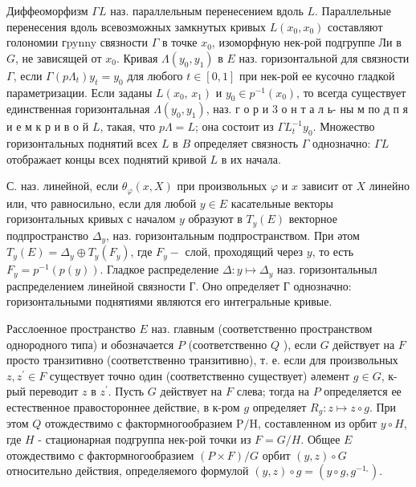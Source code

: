 \documentclass[10pt]{article}
\begin{document}
Диффеоморфизм $\Gamma L$ наз. параллельным перенесением вдоль $L$. Параллельные перенесения вдоль всевозможных замкнутых кривых $L\left(x_{0}, x_{0}\right)$ составляют голономии гpynny связности $\Gamma$ в точке $x_{0}$, изоморфную нек-рой подгруппе Ли в $G$, не зависящей от $x_{0}$. Кривая $\Lambda\left(y_{0}, y_{1}\right)$ в $E$ наз. горизонтальной для связности $\Gamma$, если $\Gamma\left(p \Lambda_{t}\right) y_{t}=y_{0}$ для любого $t \in[0,1]$ при нек-рой ее кусочно гладкой параметризации. Если заданы $L\left(x_{0}\right.$, $\left.x_{1}\right)$ и $y_{0} \in p^{-1}\left(x_{0}\right)$, то всегда существует единственная горизонтальная $\Lambda\left(y_{0}, y_{1}\right)$, наз. г о р и 3 о н т а л ь- ны м по д п я и е м к р и в о й $L$, такая, что $p \Lambda=L$; она состоит из $\Gamma L_{t}^{-1} y_{0}$. Множество горизонтальных поднятий всех $L$ в $B$ определяет связность $\Gamma$ однозначно: $\Gamma L$ отображает концы всех поднятий кривой $L$ в их начала.



С. наз. линейной, если $\theta_{\varphi}(x, X)$ при произвольных $\varphi$ и $x$ зависит от $X$ линейно или, что равносильно, если для любой $y \in E$ касательные векторы горизонтальных кривых с началом $y$ образуют в $T_{y}(E)$ векторное подпространство $\Delta_{y}$, наз. горизонтальным подпространством. При әтом $T_{y}(E)=\Delta_{y} \oplus T_{y}\left(F_{y}\right)$, где $F_{y}-$ слой, проходящий через $y$, то есть $F_{y}=p^{-1}(p(y))$. Гладкое распределение $\Delta: y \mapsto \Delta_{y}$ наз. горизонтальныл распределением линейной связности Г. Оно определяет Г однозначно: горизонтальными поднятиями являются его интегральные кривые.



Расслоенное пространство $E$ наз. главным (соответственно пространством однородного типа) и обозначается $P$ (соответственно $Q$ ), если $G$ действует на $F$ просто транзитивно (соответственно транзитивно), т. е. если для произвольных $z, z^{\prime} \in F$ существует точно один (соответственно существует) әлемент $g \in G$, к-рый переводит $z$ в $z^{\prime}$. Пусть $G$ действует на $F$ слева; тогда на $P$ определяется ее естественное правостороннее действие, в к-ром $g$ определяет $R_{g}: z \mapsto z \circ g$. При этом $Q$ отождествимо с фактормногообразием $\mathrm{P} / \mathrm{H}$, составленном из орбит $y \circ H$, где $H$ - стационарная подгруппа нек-рой точки из $F=G / H$. Общее $E$ отождествимо с фактормногообразием $(P \times F) / G$ орбит $(y, z) \circ G$ относительно действия, определяемого формулой $(y, z) \circ g=\left(y \circ g, g^{-1_{\circ}}\right)$.
\end{document}
